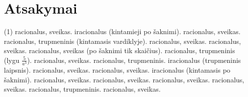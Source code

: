 \documentclass[11pt,a4paper]{scrartcl}
\begin{document}
\newpage
\section{Atsakymai}
\begin{tasks}[label={(\arabic*)}, label-offset=0.9em](1)
    \task racionalus, sveikas.
    \task iracionalus (kintamieji po šaknimi).
    \task racionalus, sveikas.
    \task racionalus, trupmeninis (kintamasis vardiklyje).
    \task racionalus, sveikas.
    \task racionalus, sveikas.
    \task racionalus, sveikas (po šaknimi tik skaičius).
    \task racionalus, trupmeninis (lygu $\frac{5}{a^3}$).
    \task racionalus, sveikas.
    \task racionalus, trupmeninis.
    \task iracionalus (trupmeninis laipsnis).
    \task racionalus, sveikas.
    \task racionalus, sveikas.
    \task iracionalus (kintamasis po šaknimi).
    \task racionalus, sveikas.
    \task racionalus, sveikas.
    \task racionalus, sveikas.
    \task racionalus, sveikas.
    \task racionalus, trupmeninis.
    \task racionalus, sveikas.
\end{tasks}
\end{document}
